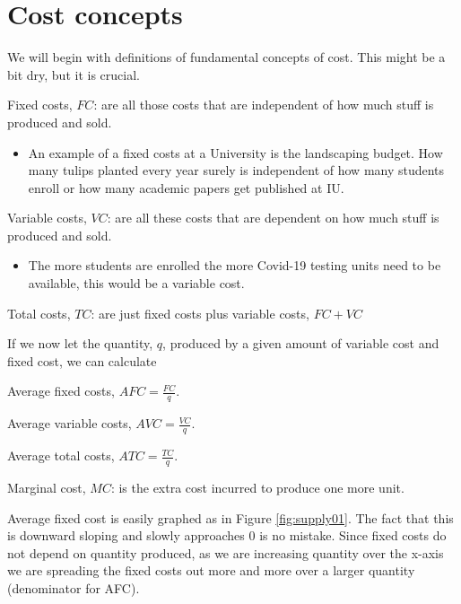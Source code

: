 \documentclass[
]{book}
\providecommand{\tightlist}{%
  \setlength{\itemsep}{0pt}\setlength{\parskip}{0pt}}
\begin{document}
\hypertarget{cost-concepts}{%
\section{Cost concepts}\label{cost-concepts}}

We will begin with definitions of fundamental concepts of cost. This might be a bit dry, but it is crucial.

Fixed costs, \(FC\): are all those costs that are independent of how much stuff is produced and sold.

\begin{itemize}
\tightlist
\item
  An example of a fixed costs at a University is the landscaping budget. How many tulips planted every year surely is independent of how many students enroll or how many academic papers get published at IU.
\end{itemize}

Variable costs, \(VC\): are all these costs that are dependent on how much stuff is produced and sold.

\begin{itemize}
\tightlist
\item
  The more students are enrolled the more Covid-19 testing units need to be available, this would be a variable cost.
\end{itemize}

Total costs, \(TC\): are just fixed costs plus variable costs, \(FC + VC\)

If we now let the quantity, \(q\), produced by a given amount of variable cost and fixed cost, we can calculate

Average fixed costs, \(AFC = \frac{FC}{q}\).

Average variable costs, \(AVC = \frac{VC}{q}\).

Average total costs, \(ATC = \frac{TC}{q}\).

Marginal cost, \(MC\): is the extra cost incurred to produce one more unit.

Average fixed cost is easily graphed as in Figure \ref{fig:supply01}. The fact that this is downward sloping and slowly approaches 0 is no mistake. Since fixed costs do not depend on quantity produced, as we are increasing quantity over the x-axis we are spreading the fixed costs out more and more over a larger quantity (denominator for AFC).
\end{document}
